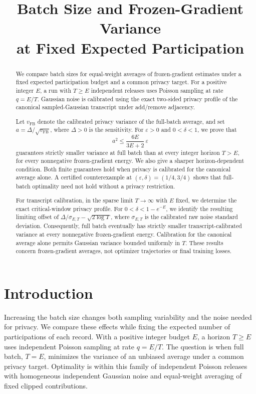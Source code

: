 \documentclass[11pt]{article}
\title{Batch Size and Frozen-Gradient Variance\\
at Fixed Expected Participation}
\author{}
\date{}
\theoremstyle{remark}
\begin{document}
\maketitle

\begin{abstract}
We compare batch sizes for equal-weight averages of frozen-gradient estimates
under a fixed expected participation budget and a common privacy target.
For a positive integer $E$, a run with $T\geq E$ independent releases uses
Poisson sampling at rate $q=E/T$. Gaussian noise is calibrated using the
exact two-sided privacy profile of the canonical sampled-Gaussian transcript
under add/remove adjacency.

Let $v_{\mathrm{FB}}$ denote the calibrated privacy variance of the full-batch
average, and set $a=\Delta/\sqrt{v_{\mathrm{FB}}}$, where $\Delta>0$ is the
sensitivity. For $\varepsilon>0$ and $0<\delta<1$, we prove that
\[
  a^2\leq\frac{6E}{3E+2}\,\varepsilon
\]
guarantees strictly smaller variance at full batch than at every integer
horizon $T>E$, for every nonnegative frozen-gradient energy. We also give a
sharper horizon-dependent condition. Both finite guarantees hold when
privacy is calibrated for the canonical average alone. A certified counterexample at
$(\varepsilon,\delta)=(1/4,3/4)$ shows that full-batch optimality need not hold
without a privacy restriction.

For transcript calibration, in the sparse limit $T\to\infty$ with $E$ fixed,
we determine the exact
critical-window privacy profile. For $0<\delta<1-e^{-E}$, we identify the
resulting limiting offset of
$\Delta/\sigma_{E,T}-\sqrt{2\log T}$, where $\sigma_{E,T}$ is the calibrated
raw noise standard deviation. Consequently, full batch eventually has
strictly smaller transcript-calibrated variance at every nonnegative
frozen-gradient energy. Calibration for the canonical average alone permits
Gaussian variance bounded uniformly in $T$.
These results concern frozen-gradient averages, not optimizer trajectories
or final training losses.
\end{abstract}

\section{Introduction}
Increasing the batch size changes both sampling variability and the noise
needed for privacy. We compare these effects while fixing the expected
number of participations of each record. With a positive integer budget $E$,
a horizon $T\geq E$ uses independent Poisson sampling at rate $q=E/T$.
The question is when full batch, $T=E$, minimizes the variance of an unbiased
average under a common privacy target. Optimality is within this family of
independent Poisson releases with homogeneous independent Gaussian noise
and equal-weight averaging of fixed clipped contributions.
\end{document}
